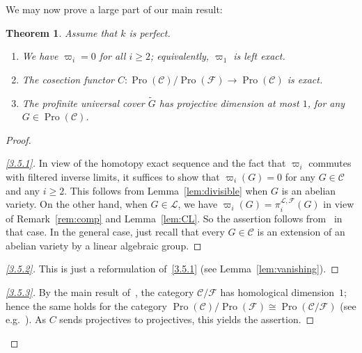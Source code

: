 \documentclass[11pt]{article}
\newtheorem{theo}{Theorem}[section]
\theoremstyle{definition}
\newenvironment{proofc}{\begin{proof}}{\end{proof}}
\numberwithin{equation}{section}
\newcommand\cC{{\mathcal C}}
\newcommand\cF{{\mathcal F}}
\newcommand\cL{{\mathcal L}}
\newcommand\tG{{\widetilde G}}
\DeclareMathOperator{\Pro}{Pro}
\newenvironment{step}[1]{\begin{proof}[#1]}{\let\qed\relax\end{proof}}
\newenvironment{laststep}[1]{\begin{proof}[#1]}{\end{proof}}
\renewenvironment{proofc}{\begin{proof}}{\end{proof}}
\theoremstyle{remark}
\newcommand*{\romanenumi}{}%
\begin{document}
We may now prove a large part of our main result:

\begin{theo}\label{thm:perfect}
Assume that $k$ is perfect.
\begin{enumerate}\romanenumi
\item \label{3.5.1} We have $\varpi_i = 0$ for all $i \geq 2$; equivalently, $\varpi_1$ is left exact.
\item \label{3.5.2} The cosection functor $C : \Pro(\cC)/\Pro(\cF) \to \Pro(\cC)$ is exact.
\item \label{3.5.3} The profinite universal cover $\tG$ has projective dimension at most $1$, for any $G \in \Pro(\cC)$.
\end{enumerate}
\end{theo}

\begin{proofc}
\begin{step}{\eqref{3.5.1}}%
In view of the homotopy exact sequence and the fact that $\varpi_i$ commutes with filtered inverse limits, it suffices to show that $\varpi_i(G) = 0$ for any $G \in \cC$ and any $i \geq 2$. This follows from Lemma~\ref{lem:divisible} when $G$ is an abelian variety. On the other hand, when $G \in \cL$, we have $\varpi_i(G) = \pi_i^{\cL,\cF}(G)$ in view of Remark~\ref{rem:comp} and Lemma~\ref{lem:CL}. So the assertion follows from~\cite[V.3.6.8]{DG} in that case. In the general case, just recall that every $G \in \cC$ is an extension of an abelian variety by a linear algebraic group.
\end{step}

\begin{step}{\eqref{3.5.2}}%
This is just a reformulation of~\eqref{3.5.1} (see Lemma~\ref{lem:vanishing}).
\end{step}

\begin{laststep}{\eqref{3.5.3}}%
By the main result of~\cite{Br17a}, the category $\cC/\cF$ has homological dimension~$1$; hence the same holds for the category $\Pro(\cC)/\Pro(\cF) \cong \Pro(\cC/\cF)$ (see e.g.~\cite[Prop.~2.12, Lem.~2.15]{Br17b}). As $C$ sends projectives to projectives, this yields the assertion.
\end{laststep}
\let\qed\relax
\end{proofc}
\end{document}

